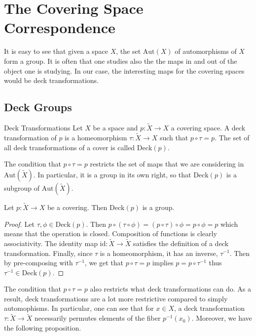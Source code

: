 \documentclass[a4paper]{article}
\begin{document}
\pagebreak
\section{The Covering Space Correspondence}
It is easy to see that given a space $X$, the set $\text{Aut}(X)$ of automorphisms of $X$ form a group. It is often that one studies also the the maps in and out of the object one is studying. In our case, the interesting maps for the covering spaces would be deck transformations. 

\subsection{Deck Groups}
\begin{defn}{Deck Transformations}{} Let $X$ be a space and $p:\tilde{X}\to X$ a covering space. A deck transformation of $p$ is a homeomorphism $\tau:\tilde{X}\to X$ such that $p\circ\tau=p$. The set of all deck transformations of a cover is called $\text{Deck}(p)$. 
\end{defn}

The condition that $p\circ\tau=p$ restricts the set of maps that we are considering in $\text{Aut}(\tilde{X})$. In particular, it is a group in its own right, so that $\text{Deck}(p)$ is a subgroup of $\text{Aut}(\tilde{X})$. 

\begin{prp}{}{} Let $p:\tilde{X}\to X$ be a covering. Then $\text{Deck}(p)$ is a group. 
\begin{proof}
Let $\tau,\phi\in\text{Deck}(p)$. Then $p\circ(\tau\circ\phi)=(p\circ\tau)\circ\phi=p\circ\phi=p$ which means that the operation is closed. Composition of functions is clearly associativity. The identity map $\text{id}:\tilde{X}\to\tilde{X}$ satisfies the definition of a deck transformation. Finally, since $\tau$ is a homeomorphism, it has an inverse, $\tau^{-1}$. Then by pre-composing with $\tau^{-1}$, we get that $p\circ\tau=p$ implies $p=p\circ\tau^{-1}$ thus $\tau^{-1}\in\text{Deck}(p)$. 
\end{proof}
\end{prp}

The condition that $p\circ\tau=p$ also restricts what deck transformations can do. As a result, deck transformations are a lot more restrictive compared to simply automophisms. In particular, one can see that for $x\in X$, a deck transformation $\tau:\tilde{X}\to\tilde{X}$ necessarily permutes elements of the fiber $p^{-1}(x_0)$. Moreover, we have the following proposition. 
\end{document}
